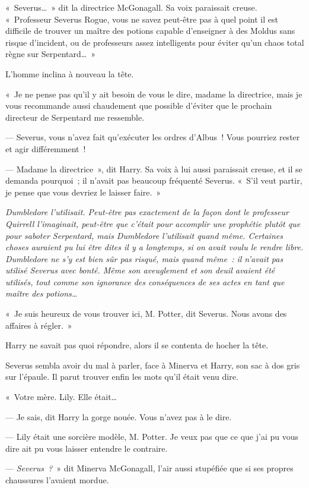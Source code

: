 «~Severus…~»
dit la directrice McGonagall.
Sa voix paraissait creuse.
«~Professeur Severus Rogue, vous ne savez peut-être pas à quel point il est difficile de trouver un maître des potions capable d'enseigner à des Moldus sans risque d'incident, ou de professeurs assez intelligents pour éviter qu'un chaos total règne sur Serpentard…~»

L'homme inclina à nouveau la tête.

«~Je ne pense pas qu'il y ait besoin de vous le dire, madame la directrice, mais je vous recommande aussi chaudement que possible d'éviter que le prochain directeur de Serpentard me ressemble.

--- Severus, vous n'avez fait qu'exécuter les ordres d'Albus~!
Vous pourriez rester et agir différemment~!

--- Madame la directrice~», dit Harry.
Sa voix à lui aussi paraissait creuse, et il se demanda pourquoi~; il n'avait pas beaucoup fréquenté Severus.
«~S'il veut partir, je pense que vous devriez le laisser faire.~»

\emph{Dumbledore l'utilisait.
Peut-être pas exactement de la façon dont le professeur Quirrell l'imaginait, peut-être que c'était pour accomplir une prophétie plutôt que pour saboter Serpentard, mais Dumbledore l'utilisait quand même.
Certaines choses auraient pu lui être dites il y a longtemps, si on avait voulu le rendre libre.
Dumbledore ne s'y est bien sûr pas risqué, mais quand même~: il n'avait pas utilisé Severus avec bonté.
Même son aveuglement et son deuil avaient été utilisés, tout comme son ignorance des conséquences de ses actes en tant que maître des potions…}

«~Je suis heureux de vous trouver ici, M. Potter, dit Severus.
Nous avons des affaires à régler.~»

Harry ne savait pas quoi répondre, alors il se contenta de hocher la tête.

Severus sembla avoir du mal à parler, face à Minerva et Harry, son sac à dos gris sur l'épaule.
Il parut trouver enfin les mots qu'il était venu dire.

«~Votre mère.
Lily. Elle était…

--- Je sais, dit Harry la gorge nouée.
Vous n'avez pas à le dire.

--- Lily était une sorcière modèle, M. Potter.
Je veux pas que ce que j'ai pu vous dire ait pu vous laisser entendre le contraire.

--- \emph{Severus~?}~» dit Minerva McGonagall, l'air aussi stupéfiée que si ses propres chaussures l'avaient mordue.

